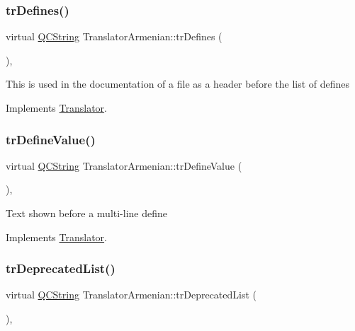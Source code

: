 \subsubsection{\texorpdfstring{trDefines()}{trDefines()}}
{\footnotesize\ttfamily virtual \mbox{\hyperlink{class_q_c_string}{Q\+C\+String}} Translator\+Armenian\+::tr\+Defines (\begin{DoxyParamCaption}{ }\end{DoxyParamCaption})\hspace{0.3cm}{\ttfamily [inline]}, {\ttfamily [virtual]}}

This is used in the documentation of a file as a header before the list of defines 

Implements \mbox{\hyperlink{class_translator}{Translator}}.

\mbox{\label{class_translator_armenian_a39e8bf2d4a331136e555d70937d829aa}} 
\subsubsection{\texorpdfstring{trDefineValue()}{trDefineValue()}}
{\footnotesize\ttfamily virtual \mbox{\hyperlink{class_q_c_string}{Q\+C\+String}} Translator\+Armenian\+::tr\+Define\+Value (\begin{DoxyParamCaption}{ }\end{DoxyParamCaption})\hspace{0.3cm}{\ttfamily [inline]}, {\ttfamily [virtual]}}

Text shown before a multi-\/line define 

Implements \mbox{\hyperlink{class_translator}{Translator}}.

\mbox{\label{class_translator_armenian_a1c7721bd5e2b05ecf4f34d8ee494bec2}} 
\subsubsection{\texorpdfstring{trDeprecatedList()}{trDeprecatedList()}}
{\footnotesize\ttfamily virtual \mbox{\hyperlink{class_q_c_string}{Q\+C\+String}} Translator\+Armenian\+::tr\+Deprecated\+List (\begin{DoxyParamCaption}{ }\end{DoxyParamCaption})\hspace{0.3cm}{\ttfamily [inline]}, {\ttfamily [virtual]}}


